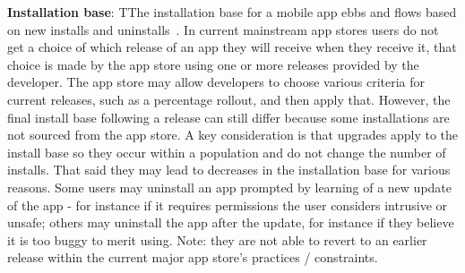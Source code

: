 \textbf{Installation base}: TThe installation base for a mobile app ebbs and flows based on new installs and uninstalls~. In current mainstream app stores users do not get a choice of which release of an app they will receive when they receive it, that choice is made by the app store using one or more releases provided by the developer. The app store may allow developers to choose various criteria for current releases, such as a percentage rollout, and then apply that. However, the final install base following a release can still differ because some installations are not sourced from the app store. A key consideration is that upgrades apply to the install base so they occur within a population and do not change the number of installs. That said they may lead to decreases in the installation base for various reasons. Some users may uninstall an app prompted by learning of a new update of the app - for instance if it requires permissions the user considers intrusive or unsafe; others may uninstall the app after the update, for instance if they believe it is too buggy to merit using. Note: they are not able to revert to an earlier release within the current major app store's practices / constraints. 

